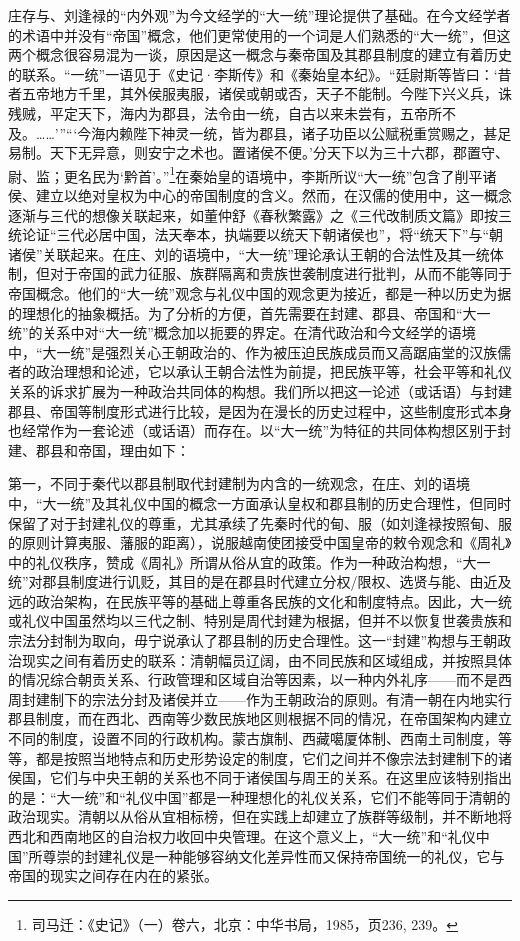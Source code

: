 \documentclass[a4paper, 12pt, openright]{ctexbook}
\begin{document}
庄存与、刘逢禄的“内外观”为今文经学的“大一统”理论提供了基础。在今文经学者的术语中并没有“帝国”概念，他们更常使用的一个词是人们熟悉的“大一统”，但这两个概念很容易混为一谈，原因是这一概念与秦帝国及其郡县制度的建立有着历史的联系。“一统”一语见于《史记·李斯传》和《秦始皇本纪》。“廷尉斯等皆曰：‘昔者五帝地方千里，其外侯服夷服，诸侯或朝或否，天子不能制。今陛下兴义兵，诛残贼，平定天下，海内为郡县，法令由一统，自古以来未尝有，五帝所不及。……’”“‘今海内赖陛下神灵一统，皆为郡县，诸子功臣以公赋税重赏赐之，甚足易制。天下无异意，则安宁之术也。置诸侯不便。’分天下以为三十六郡，郡置守、尉、监；更名民为‘黔首’。”\footnote{司马迁：《史记》（一）卷六，北京：中华书局，1985，页236, 239。}在秦始皇的语境中，李斯所议“大一统”包含了削平诸侯、建立以绝对皇权为中心的帝国制度的含义。然而，在汉儒的使用中，这一概念逐渐与三代的想像关联起来，如董仲舒《春秋繁露》之《三代改制质文篇》即按三统论证“三代必居中国，法天奉本，执端要以统天下朝诸侯也”，将“统天下”与“朝诸侯”关联起来。在庄、刘的语境中，“大一统”理论承认王朝的合法性及其一统体制，但对于帝国的武力征服、族群隔离和贵族世袭制度进行批判，从而不能等同于帝国概念。他们的“大一统”观念与礼仪中国的观念更为接近，都是一种以历史为据的理想化的抽象概括。为了分析的方便，首先需要在封建、郡县、帝国和“大一统”的关系中对“大一统”概念加以扼要的界定。在清代政治和今文经学的语境中，“大一统”是强烈关心王朝政治的、作为被压迫民族成员而又高踞庙堂的汉族儒者的政治理想和论述，它以承认王朝合法性为前提，把民族平等，社会平等和礼仪关系的诉求扩展为一种政治共同体的构想。我们所以把这一论述（或话语）与封建郡县、帝国等制度形式进行比较，是因为在漫长的历史过程中，这些制度形式本身也经常作为一套论述（或话语）而存在。以“大一统”为特征的共同体构想区别于封建、郡县和帝国，理由如下：

第一，不同于秦代以郡县制取代封建制为内含的一统观念，在庄、刘的语境中，“大一统”及其礼仪中国的概念一方面承认皇权和郡县制的历史合理性，但同时保留了对于封建礼仪的尊重，尤其承续了先秦时代的甸、服（如刘逢禄按照甸、服的原则计算夷服、藩服的距离），说服越南使团接受中国皇帝的敕令观念和《周礼》中的礼仪秩序，赞成《周礼》所谓从俗从宜的政策。作为一种政治构想，“大一统”对郡县制度进行讥贬，其目的是在郡县时代建立分权/限权、选贤与能、由近及远的政治架构，在民族平等的基础上尊重各民族的文化和制度特点。因此，大一统或礼仪中国虽然均以三代之制、特别是周代封建为根据，但并不以恢复世袭贵族和宗法分封制为取向，毋宁说承认了郡县制的历史合理性。这一“封建”构想与王朝政治现实之间有着历史的联系：清朝幅员辽阔，由不同民族和区域组成，并按照具体的情况综合朝贡关系、行政管理和区域自治等因素，以一种内外礼序——而不是西周封建制下的宗法分封及诸侯并立——作为王朝政治的原则。有清一朝在内地实行郡县制度，而在西北、西南等少数民族地区则根据不同的情况，在帝国架构内建立不同的制度，设置不同的行政机构。蒙古旗制、西藏噶厦体制、西南土司制度，等等，都是按照当地特点和历史形势设定的制度，它们之间并不像宗法封建制下的诸侯国，它们与中央王朝的关系也不同于诸侯国与周王的关系。在这里应该特别指出的是：“大一统”和“礼仪中国”都是一种理想化的礼仪关系，它们不能等同于清朝的政治现实。清朝以从俗从宜相标榜，但在实践上却建立了族群等级制，并不断地将西北和西南地区的自治权力收回中央管理。在这个意义上，“大一统”和“礼仪中国”所尊崇的封建礼仪是一种能够容纳文化差异性而又保持帝国统一的礼仪，它与帝国的现实之间存在内在的紧张。
\end{document}
